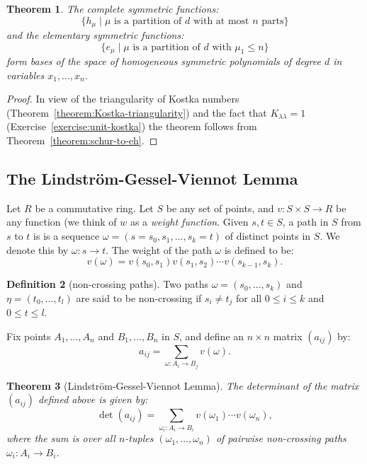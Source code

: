 \documentclass[11pt]{amsart}
\newtheorem{theorem}{Theorem}[subsection]
\theoremstyle{definition}
\newtheorem{definition}[theorem]{Definition}
\theoremstyle{example}
\begin{document}
\begin{theorem}
  The complete symmetric functions:
  \begin{displaymath}
    \{h_\mu \mid \text{$\mu$ is a partition of $d$ with at most $n$ parts}\}
  \end{displaymath}
  and the elementary symmetric functions:
  \begin{displaymath}
    \{e_\mu\mid \text{$\mu$ is a partition of $d$ with $\mu_1\leq n$}\}
  \end{displaymath}
  form bases of the space of homogeneous symmetric polynomials of degree $d$ in variables $x_1,\dotsc,x_n$.
\end{theorem}
\begin{proof}
  In view of the triangularity of Kostka numbers (Theorem~\ref{theorem:Kostka-triangularity}) and the fact that $K_{\lambda\lambda}=1$ (Exercise~\ref{exercise:unit-kostka}) the theorem follows from Theorem~\ref{theorem:schur-to-eh}.
\end{proof}
\subsection{The Lindstr\"om-Gessel-Viennot Lemma}
\label{sec:lgv}
Let $R$ be a commutative ring.
Let $S$ be any set of points, and $v:S\times S\to R$ be any function (we think of $w$ as a \emph{weight function}.
Given $s, t\in S$, a path in $S$ from $s$ to $t$ is is a sequence $\omega=(s=s_0,s_1,\dotsc,s_k=t)$ of distinct points in $S$.
We denote this by $\omega:s\to t$.
The weight of the path $\omega$ is defined to be:
\begin{displaymath}
  v(\omega) = v(s_0,s_1)v(s_1,s_2)\dotsb v(s_{k-1}, s_k).
\end{displaymath}
\begin{definition}
  [non-crossing paths]
  Two paths $\omega=(s_0,\dotsc, s_k)$ and $\eta=(t_0,\dotsc,t_l)$ are said to be non-crossing if $s_i\neq t_j$ for all $0\leq i \leq k$ and $0\leq t \leq l$.
\end{definition}
Fix points $A_1,\dotsc, A_n$ and $B_1,\dotsc, B_n$ in $S$, and define an $n\times n$ matrix $(a_{ij})$ by:
\begin{displaymath}
  a_{ij} = \sum_{\omega:A_i\to B_j} v(\omega).
\end{displaymath}
\begin{theorem}
  [Lindstr\"om-Gessel-Viennot Lemma]
  \label{lemma:lgv}
  The determinant of the matrix $(a_{ij})$ defined above is given by:
  \begin{displaymath}
    \det(a_{ij}) = \sum_{\omega_i:A_i\to B_i} v(\omega_1)\dotsb v(\omega_n),
  \end{displaymath}
  where the sum is over all $n$-tuples $(\omega_1,\dotsc, \omega_n)$ of pairwise non-crossing paths $\omega_i:A_i\to B_i$.
\end{theorem}
\end{document}

